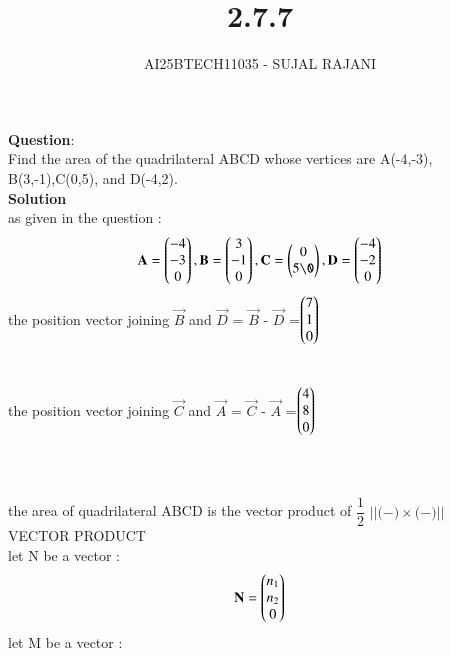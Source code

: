 \documentclass[journal,12pt,onecolumn]{IEEEtran}
\begin{document}
\title{2.7.7}
\author{AI25BTECH11035 - SUJAL RAJANI}
{\let\newpage\relax\maketitle}
\textbf{Question}:
\\
Find the area of the quadrilateral ABCD whose vertices are A(-4,-3), B(3,-1),C(0,5), and D(-4,2).
\\
 \textbf{Solution}
 \\
as given in the question :
\begin{align*}
     \vec{A}=\myvec{-4\\-3\\0},
     \vec{B}=\myvec{3\\-1\\0},
     \vec{C}=\myvec{0\\5\0},
     \vec{D}=\myvec{-4\\-2\\0}
\end{align*}
the position vector joining $\vec{B}$ and $\vec{D}$ =  $\vec{B}$ -  $\vec{D}$ =$\begin{pmatrix}7\\1\\0\end{pmatrix}$ 
\\
\\
\\
the position vector joining $\vec{C}$ and $\vec{A}$ =  $\vec{C}$ -  $\vec{A}$ =$\begin{pmatrix}4\\8\\0\end{pmatrix}$
\\
\\
\\
\\
the area of quadrilateral ABCD is the vector  product of $\dfrac{1}{2}$ $||($$ -  $$)\times($$ -  $$)||$
\\  
{VECTOR PRODUCT}
\\
let N be a vector :
\begin{align}
    \mathbf{N}=\begin{pmatrix}n_1\\n_2\\0\end{pmatrix}
    \\
    \end{align}
    let M be a vector :
\end{document}
